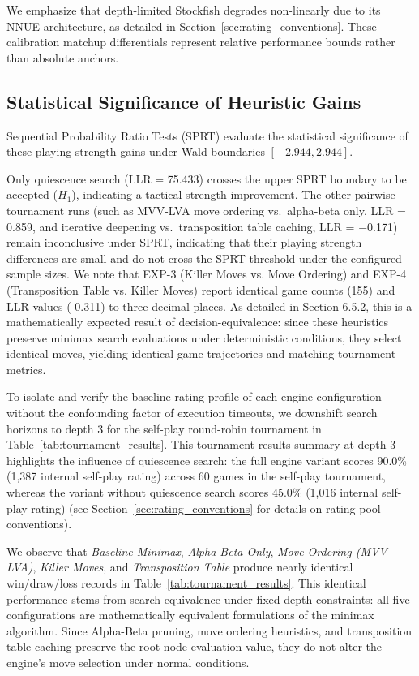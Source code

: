We emphasize that depth-limited Stockfish degrades non-linearly due to its NNUE architecture, as detailed in Section~\ref{sec:rating_conventions}. These calibration matchup differentials represent relative performance bounds rather than absolute anchors.

\subsection{Statistical Significance of Heuristic Gains}
Sequential Probability Ratio Tests (SPRT) evaluate the statistical significance of these playing strength gains under Wald boundaries $[-2.944, 2.944]$.



Only quiescence search (LLR = 75.433) crosses the upper SPRT boundary to be accepted ($H_1$), indicating a tactical strength improvement. The other pairwise tournament runs (such as MVV-LVA move ordering vs.\ alpha-beta only, LLR = 0.859, and iterative deepening vs.\ transposition table caching, LLR = $-$0.171) remain inconclusive under SPRT, indicating that their playing strength differences are small and do not cross the SPRT threshold under the configured sample sizes. We note that EXP-3 (Killer Moves vs. Move Ordering) and EXP-4 (Transposition Table vs. Killer Moves) report identical game counts (155) and LLR values (-0.311) to three decimal places. As detailed in Section 6.5.2, this is a mathematically expected result of decision-equivalence: since these heuristics preserve minimax search evaluations under deterministic conditions, they select identical moves, yielding identical game trajectories and matching tournament metrics.

To isolate and verify the baseline rating profile of each engine configuration without the confounding factor of execution timeouts, we downshift search horizons to depth 3 for the self-play round-robin tournament in Table~\ref{tab:tournament_results}. This tournament results summary at depth 3 highlights the influence of quiescence search: the full engine variant scores 90.0\% (1,387 internal self-play rating) across 60 games in the self-play tournament, whereas the variant without quiescence search scores 45.0\% (1,016 internal self-play rating) (see Section~\ref{sec:rating_conventions} for details on rating pool conventions).



We observe that \textit{Baseline Minimax}, \textit{Alpha-Beta Only}, \textit{Move Ordering (MVV-LVA)}, \textit{Killer Moves}, and \textit{Transposition Table} produce nearly identical win/draw/loss records in Table~\ref{tab:tournament_results}. This identical performance stems from search equivalence under fixed-depth constraints: all five configurations are mathematically equivalent formulations of the minimax algorithm. Since Alpha-Beta pruning, move ordering heuristics, and transposition table caching preserve the root node evaluation value, they do not alter the engine's move selection under normal conditions. 

